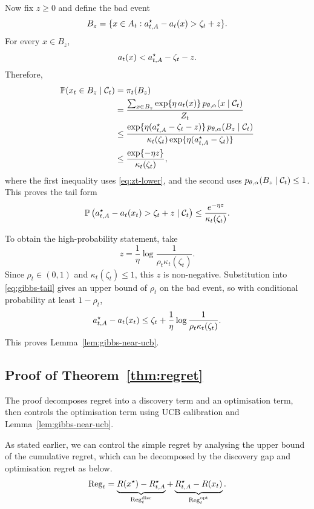 Now fix $z\ge0$ and define the bad event
\[
B_z=
\{x\in A_t:a_{t,A}^\star-a_t(x)>\zeta_t+z\}.
\]
For every $x\in B_z$,
\[
a_t(x)<a_{t,A}^\star-\zeta_t-z.
\]
Therefore,
\begin{align}
\mathbb{P}(x_t\in B_z\mid\mathcal{C}_t)
&=
\pi_t(B_z) \notag\\
&=
\frac{\sum_{x\in B_z}\exp\{\eta\,a_t(x)\}\,p_{\theta,\alpha}(x\mid\mathcal{C}_t)}{Z_t} \notag\\
&\le
\frac{\exp\{\eta(a_{t,A}^\star-\zeta_t-z)\}\,p_{\theta,\alpha}(B_z\mid\mathcal{C}_t)}
{\kappa_t(\zeta_t)\exp\{\eta(a_{t,A}^\star-\zeta_t)\}} \notag\\
&\le
\frac{\exp\{-\eta z\}}{\kappa_t(\zeta_t)},
\label{eq:gibbs-tail}
\end{align}
where the first inequality uses \eqref{eq:zt-lower}, and the second uses $p_{\theta,\alpha}(B_z\mid\mathcal{C}_t)\le1$. This proves the
tail form
\[
\mathbb{P}\left(
a_{t,A}^\star-a_t(x_t)>\zeta_t+z
\mid
\mathcal{C}_t
\right)
\le
\frac{e^{-\eta z}}{\kappa_t(\zeta_t)}.
\]

To obtain the high-probability statement, take
\[
z=\frac1\eta\log\frac1{\rho_t\kappa_t(\zeta_t)}.
\]
Since $\rho_t\in(0,1)$ and $\kappa_t(\zeta_t)\le1$, this $z$ is non-negative. Substitution into
\eqref{eq:gibbs-tail} gives an upper bound of $\rho_t$ on the bad event, so with conditional probability at
least $1-\rho_t$,
\[
a_{t,A}^\star-a_t(x_t)
\le
\zeta_t+\frac1\eta\log\frac1{\rho_t\kappa_t(\zeta_t)}.
\]
This proves Lemma~\ref{lem:gibbs-near-ucb}.

\subsection{Proof of Theorem~\ref{thm:regret}}
\label{app:main-proof}

The proof decomposes regret into a discovery term and an optimisation term, then controls the optimisation term
using UCB calibration and Lemma~\ref{lem:gibbs-near-ucb}.

As stated earlier, we can control the simple regret by analysing the upper bound of the cumulative regret, which can be decomposed by the discovery gap and optimisation regret as below.
\begin{equation}
\mathrm{Reg}_t
=
\underbrace{R(x^\star)-R_{t,A}^\star}_{\mathrm{Reg}_t^{\rm disc}}
+
\underbrace{R_{t,A}^\star-R(x_t)}_{\mathrm{Reg}_t^{\rm opt}}.
\label{eq:disc-opt-decomp}
\end{equation}


